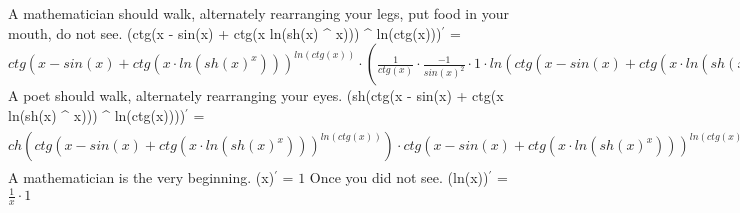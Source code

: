 \documentclass{article}
\begin{document}
{\large A mathematician should walk, alternately rearranging your legs, put food in your mouth, do not see. 
\newline\newline
(ctg(x - sin(x) + ctg(x \cdot ln(sh(x) ^ {x}))) ^ {ln(ctg(x))})$^{'}$ = $ctg(x - sin(x) + ctg(x \cdot ln(sh(x) ^ {x}))) ^ {ln(ctg(x))} \cdot (\frac{1}{ctg(x)} \cdot \frac{-1}{sin(x) ^ {2}} \cdot 1 \cdot ln(ctg(x - sin(x) + ctg(x \cdot ln(sh(x) ^ {x})))) + ln(ctg(x)) \cdot \frac{1}{ctg(x - sin(x) + ctg(x \cdot ln(sh(x) ^ {x})))} \cdot \frac{-1}{sin(x - sin(x) + ctg(x \cdot ln(sh(x) ^ {x}))) ^ {2}} \cdot (1 - cos(x) \cdot 1 + \frac{-1}{sin(x \cdot ln(sh(x) ^ {x})) ^ {2}} \cdot (1 \cdot ln(sh(x) ^ {x}) + x \cdot \frac{1}{sh(x) ^ {x}} \cdot sh(x) ^ {x} \cdot (1 \cdot ln(sh(x)) + x \cdot \frac{1}{sh(x)} \cdot ch(x) \cdot 1))))$} \newline\newline
{\large A poet should walk, alternately rearranging your eyes. 
\newline\newline
(sh(ctg(x - sin(x) + ctg(x \cdot ln(sh(x) ^ {x}))) ^ {ln(ctg(x))}))$^{'}$ = $ch(ctg(x - sin(x) + ctg(x \cdot ln(sh(x) ^ {x}))) ^ {ln(ctg(x))}) \cdot ctg(x - sin(x) + ctg(x \cdot ln(sh(x) ^ {x}))) ^ {ln(ctg(x))} \cdot (\frac{1}{ctg(x)} \cdot \frac{-1}{sin(x) ^ {2}} \cdot 1 \cdot ln(ctg(x - sin(x) + ctg(x \cdot ln(sh(x) ^ {x})))) + ln(ctg(x)) \cdot \frac{1}{ctg(x - sin(x) + ctg(x \cdot ln(sh(x) ^ {x})))} \cdot \frac{-1}{sin(x - sin(x) + ctg(x \cdot ln(sh(x) ^ {x}))) ^ {2}} \cdot (1 - cos(x) \cdot 1 + \frac{-1}{sin(x \cdot ln(sh(x) ^ {x})) ^ {2}} \cdot (1 \cdot ln(sh(x) ^ {x}) + x \cdot \frac{1}{sh(x) ^ {x}} \cdot sh(x) ^ {x} \cdot (1 \cdot ln(sh(x)) + x \cdot \frac{1}{sh(x)} \cdot ch(x) \cdot 1))))$} \newline\newline
{\large A mathematician is the very beginning. 
\newline\newline
(x)$^{'}$ = $1$} \newline\newline
{\large Once you did not see. 
\newline\newline
(ln(x))$^{'}$ = $\frac{1}{x} \cdot 1$} \newline\newline
\end{document}
